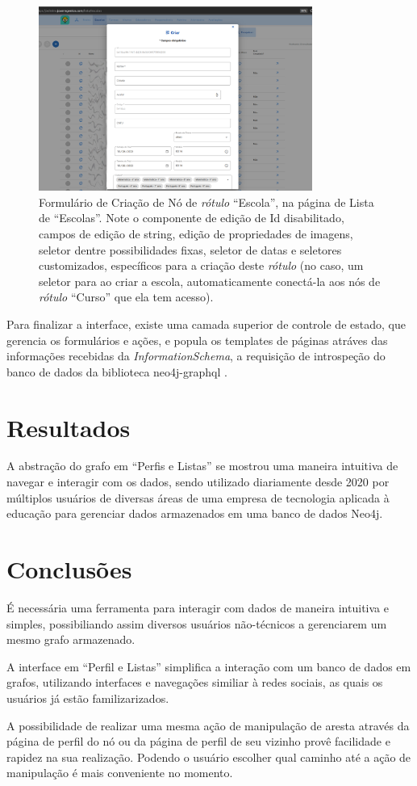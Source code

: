 \documentclass[12pt]{article}
\begin{document}
\begin{figure}[ht]
\centering
\includegraphics[width=0.8\textwidth]{reusable-form.png}
\caption{Formulário de Criação de Nó de \textit{rótulo} ``Escola'', na página de Lista de ``Escolas''. Note o componente de edição de Id disabilitado, campos de edição de string, edição de propriedades de imagens, seletor dentre possibilidades fixas, seletor de datas e seletores customizados, específicos para a criação deste \textit{rótulo} (no caso, um seletor para ao criar a escola, automaticamente conectá-la aos nós de \textit{rótulo} ``Curso'' que ela tem acesso).}
\label{fig:reusable-form}
\end{figure}

Para finalizar a interface, existe uma camada superior de controle de estado, que gerencia os formulários e ações, e popula os templates de páginas atráves das informações recebidas da \textit{InformationSchema}, a requisição de introspeção do banco de dados da biblioteca neo4j-graphql \cite{Neo4jGraphQL}.

\section{Resultados}
A abstração do grafo em ``Perfis e Listas'' se mostrou uma maneira intuitiva de navegar e interagir com os dados, sendo utilizado diariamente desde 2020 por múltiplos usuários de diversas áreas de uma empresa de tecnologia aplicada à educação para gerenciar dados armazenados em uma banco de dados Neo4j.

\section{Conclusões}
É necessária uma ferramenta para interagir com dados de maneira intuitiva e simples, possibiliando assim diversos usuários não-técnicos a gerenciarem um mesmo grafo armazenado.

A interface em ``Perfil e Listas'' simplifica a interação com um banco de dados em grafos, utilizando interfaces e navegações similiar à redes sociais, as quais os usuários já estão familizarizados.

A possibilidade de realizar uma mesma ação de manipulação de aresta através da página de perfil do nó ou da página de perfil de seu vizinho provê facilidade e rapidez na sua realização. Podendo o usuário escolher qual caminho até a ação de manipulação é mais conveniente no momento.



\end{document}
